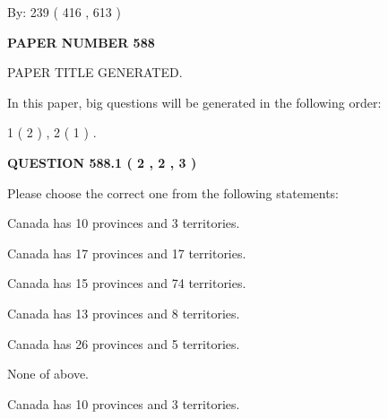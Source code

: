 \documentclass[12pt]{article}
\begin{document}
   
\hspace{1.0in} By: 
 239 ( 416 ,  613 )
   
   
   
   
\newpage 
\setcounter{page}{ 
   588001 } 
   
   
   
   
 {\textbf{ \Large{ PAPER NUMBER  588  }}}
   
   
\vspace{0.2in}
   
   
   
   
   
   
   
   
 \vspace{0.2in}
 
 
 
 
   
   
 PAPER TITLE GENERATED.
   
   
   
\vspace{0.2in}
   
In this paper, big questions will be generated in the following order: 
   
   
   1 ( 2 )
 ,
   2 ( 1 )
 .
  
\vspace{0.2in}
  
{\textbf{\Large{QUESTION
588.1 
 ( 2 , 2 , 3 )
}}}
  
  
Please choose the correct one from the following statements:
 
 
Canada has 10  provinces and 3 territories.
 
 
Canada has  17 provinces and  17 territories.
 
 
Canada has  15 provinces and  74 territories.
 
 
Canada has  13 provinces and  8 territories.
 
 
Canada has  26 provinces and  5 territories.
 
 
 None of above.
 
 
\noindent{}
 
 
Canada has 10  provinces and 3 territories.
 
\end{document}
